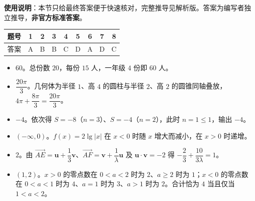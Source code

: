 
\begin{gknotice}
\textbf{使用说明}：本节只给最终答案便于快速核对，完整推导见解析版。答案为编写者独立推导，\textbf{非官方标准答案}。
\end{gknotice}

\begin{center}\begin{tabular}{ccccccccc}
\toprule
题号 & 1 & 2 & 3 & 4 & 5 & 6 & 7 & 8 \\
\midrule
答案 & A & B & B & C & D & A & D & C \\
\bottomrule
\end{tabular}\end{center}

\begin{itemize}[leftmargin=2.6em]
  \item[\textbf{9.}] $60$。总份数 $20$，每份 $15$ 人，一年级 $4$ 份即 $60$ 人。
  \item[\textbf{10.}] $\dfrac{20\pi}{3}$。几何体为半径 $1$、高 $4$ 的圆柱与半径 $2$、高 $2$ 的圆锥同轴叠放，$4\pi+\dfrac{8\pi}{3}=\dfrac{20\pi}{3}$。
  \item[\textbf{11.}] $-4$。依次得 $S=-8$（$n=3$）、$S=-4$（$n=2$），此时 $n=1\leqslant 1$，输出 $-4$。
  \item[\textbf{12.}] $(-\infty,0)$。$f(x)=2\lg|x|$ 在 $x<0$ 时随 $x$ 增大而减小，在 $x>0$ 时递增。
  \item[\textbf{13.}] $2$。由 $\overrightarrow{AE}=\boldsymbol u+\dfrac13\boldsymbol v$、$\overrightarrow{AF}=\boldsymbol v+\dfrac1\lambda\boldsymbol u$ 及 $\boldsymbol u\cdot\boldsymbol v=-2$ 得 $-\dfrac23+\dfrac{10}{3\lambda}=1$。
  \item[\textbf{14.}] $(1,2)$。$x>0$ 的零点数在 $0<a<2$ 时为 $2$、$a\geqslant 2$ 时为 $1$；$x<0$ 的零点数在 $0<a<1$ 时为 $4$、$a=1$ 时为 $3$、$a>1$ 时为 $2$。合计恰为 $4$ 当且仅当 $1<a<2$。
\end{itemize}

